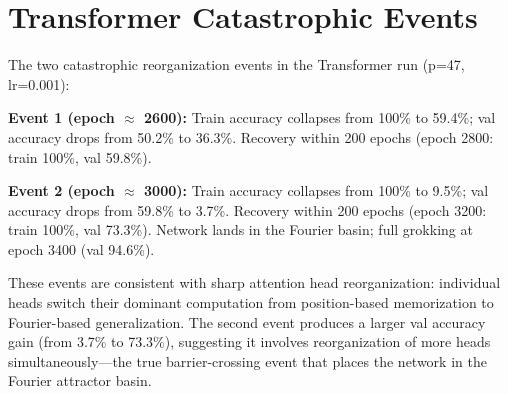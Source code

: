 \documentclass[11pt,twocolumn]{article}
\begin{document}
\section{Transformer Catastrophic Events}
\label{app:catastrophe}

The two catastrophic reorganization events in the Transformer run (p=47, lr=0.001):

\textbf{Event 1 (epoch $\approx$ 2600):} Train accuracy collapses from 100\% to 59.4\%; val accuracy drops from 50.2\% to 36.3\%. Recovery within 200 epochs (epoch 2800: train 100\%, val 59.8\%).

\textbf{Event 2 (epoch $\approx$ 3000):} Train accuracy collapses from 100\% to 9.5\%; val accuracy drops from 59.8\% to 3.7\%. Recovery within 200 epochs (epoch 3200: train 100\%, val 73.3\%). Network lands in the Fourier basin; full grokking at epoch 3400 (val 94.6\%).

These events are consistent with sharp attention head reorganization: individual heads switch their dominant computation from position-based memorization to Fourier-based generalization. The second event produces a larger val accuracy gain (from 3.7\% to 73.3\%), suggesting it involves reorganization of more heads simultaneously---the true barrier-crossing event that places the network in the Fourier attractor basin.
\end{document}
